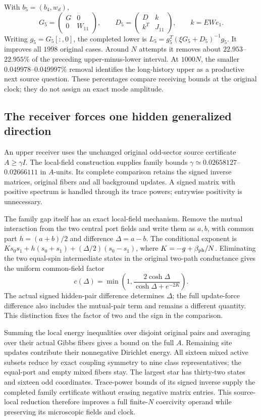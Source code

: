 With $b_5=(b_4,w_d)$,
\[
 G_5=\begin{pmatrix}G&0\\0&W_{11}\end{pmatrix},\qquad
 D_5=\begin{pmatrix}D&k\\k^T&J_{11}\end{pmatrix},
 \qquad k=EWe_1.
\]
Writing $g_5=G_5[:,0]$, the completed lower is $L_5=g_5^T(\xi G_5+D_5)^{-1}g_5$. It improves all $1998$ original cases. Around $N$ attempts it removes about $22.953$--$22.955\%$ of the preceding upper-minus-lower interval. At $1000N$, the smaller $0.049978$--$0.049997\%$ removal identifies the long-history upper as a productive next source question. These percentages compare receiving bounds at the original clock; they do not assign an exact mode amplitude.

\subsection{The receiver forces one hidden generalized direction}

An upper receiver uses the unchanged original odd-sector source certificate $A\geq\gamma I$. The local-field construction supplies family bounds $\gamma\simeq0.02658127$--$0.02666111$ in $A$-units. Its complete comparison retains the signed inverse matrices, original fibers and all background updates. A signed matrix with positive spectrum is handled through its trace powers; entrywise positivity is unnecessary. 

The family gap itself has an exact local-field mechanism. Remove the mutual interaction from the two central port fields and write them as $a,b$, with common part $h=(a+b)/2$ and difference $\Delta=a-b$. The conditional exponent is $Ks_0s_1+h(s_0+s_1)+(\Delta/2)(s_0-s_1)$, where $K=-g+\beta_{\rm ph}/N$. Eliminating the two equal-spin intermediate states in the original two-path conductance gives the uniform common-field factor
\[
 c(\Delta)=\min\left(1,
       \frac{2\cosh\Delta}{\cosh\Delta+e^{-2K}}\right).
\]
The actual signed hidden-pair difference determines $\Delta$; the full update-force difference also includes the mutual-pair term and remains a different quantity. This distinction fixes the factor of two and the sign in the comparison.

Summing the local energy inequalities over disjoint original pairs and averaging over their actual Gibbs fibers gives a bound on the full $A$. Remaining site updates contribute their nonnegative Dirichlet energy. All sixteen mixed active subsets reduce by exact coupling symmetry to nine class representatives; the equal-port and empty mixed fibers stay. The largest star has thirty-two states and sixteen odd coordinates. Trace-power bounds of its signed inverse supply the completed family certificate without erasing negative matrix entries. This source-local reduction therefore improves a full finite-$N$ coercivity operand while preserving its microscopic fields and clock. 

